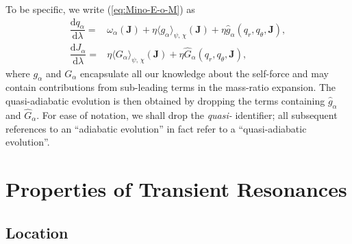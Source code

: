 \documentclass[aps,prd,amsfonts,amssymb,amsmath,nofootinbib,reprint,showpacs,superscriptaddress,twocolumn]{revtex4}
\newcommand{\eqnref}[1]{(\ref{eq:#1})}
\newcommand{\dd}{\ensuremath{\mathrm{d}}}
\newcommand{\diff}[2]{\ensuremath{\dfrac{\dd {#1}}{\dd {#2}}}}
\begin{document}
To be specific, we write \eqnref{Mino-E-o-M} as
\begin{subequations}
\begin{align}
\label{eq:Mino-E-o-M2}
\diff{q_\alpha}{\lambda} = {} & \omega_\alpha(\boldsymbol{J}) + \eta \langle g_\alpha\rangle_{\psi,\,\chi}(\boldsymbol{J}) + \eta \hat{g}_\alpha(q_r,q_\theta,\boldsymbol{J}), \\
\diff{J_\alpha}{\lambda} = {} & \eta \langle G_\alpha\rangle_{\psi,\,\chi}(\boldsymbol{J}) + \eta \hat{G}_\alpha(q_r,q_\theta,\boldsymbol{J}),
\end{align}
\end{subequations}
where $g_\alpha$ and $G_\alpha$ encapsulate all our knowledge about the self-force and may contain contributions from sub-leading terms in the mass-ratio expansion. The quasi-adiabatic evolution is then obtained by dropping the terms containing $\hat{g}_\alpha$ and $\hat{G}_\alpha$. For ease of notation, we shall drop the \emph{quasi-} identifier; all subsequent references to an ``adiabatic evolution'' in fact refer to a ``quasi-adiabatic evolution''.


\section{Properties of Transient Resonances}
\label{sec:properties}
\subsection{Location}
\end{document}
